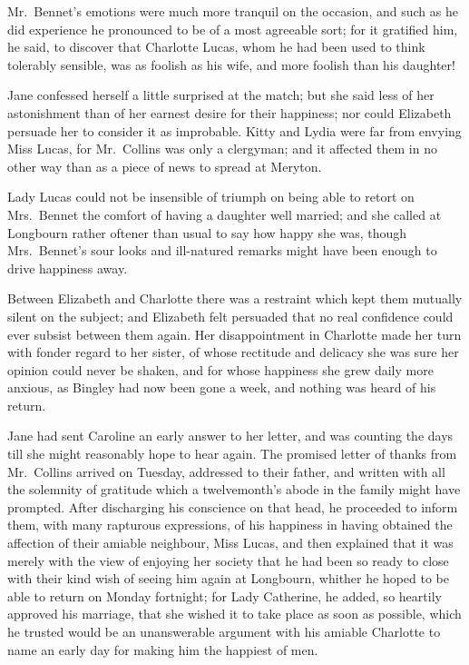 Mr.\ Bennet’s emotions were much more tranquil on the
occasion, and such as he did experience he pronounced
to be of a most agreeable sort; for it gratified him, he
said, to discover that Charlotte Lucas, whom he had been
used to think tolerably sensible, was as foolish as his wife,
and more foolish than his daughter!

Jane confessed herself a little surprised at the match;
but she said less of her astonishment than of her earnest
desire for their happiness; nor could Elizabeth persuade
her to consider it as improbable. Kitty and Lydia were
far from envying Miss Lucas, for Mr.\ Collins was only
a clergyman; and it affected them in no other way than
as a piece of news to spread at Meryton.

Lady Lucas could not be insensible of triumph on being
able to retort on Mrs.\ Bennet the comfort of having a
daughter well married; and she called at Longbourn
rather oftener than usual to say how happy she was,
though Mrs.\ Bennet’s sour looks and ill-natured remarks
might have been enough to drive happiness away.

Between Elizabeth and Charlotte there was a restraint
which kept them mutually silent on the subject; and
Elizabeth felt persuaded that no real confidence could
ever subsist between them again. Her disappointment
in Charlotte made her turn with fonder regard to her
sister, of whose rectitude and delicacy she was sure her
opinion could never be shaken, and for whose happiness
she grew daily more anxious, as Bingley had now been
gone a week, and nothing was heard of his return.

Jane had sent Caroline an early answer to her letter,
and was counting the days till she might reasonably hope
to hear again. The promised letter of thanks from
Mr.\ Collins arrived on Tuesday, addressed to their father,
and written with all the solemnity of gratitude which a
twelvemonth’s abode in the family might have prompted.
After discharging his conscience on that head, he proceeded
to inform them, with many rapturous expressions,
of his happiness in having obtained the affection of their
amiable neighbour, Miss Lucas, and then explained that
it was merely with the view of enjoying her society that
he had been so ready to close with their kind wish of
seeing him again at Longbourn, whither he hoped to be
able to return on Monday fortnight; for Lady Catherine,
he added, so heartily approved his marriage, that she
wished it to take place as soon as possible, which he trusted
would be an unanswerable argument with his amiable
Charlotte to name an early day for making him the happiest
of men.

